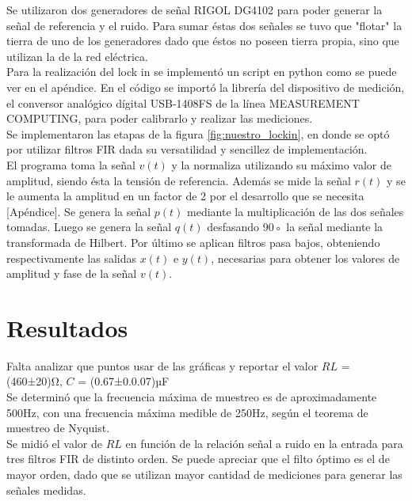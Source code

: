 \documentclass[11pt,a4paper]{extarticle}
\begin{document}
\begin{multicols}{2}
Se utilizaron dos generadores de señal RIGOL DG4102 
para poder generar la señal de referencia y el ruido.
Para sumar éstas dos señales se tuvo que "flotar" la 
tierra de uno de los generadores dado que éstos no poseen 
tierra propia, sino que utilizan la de la red eléctrica.\\

Para la realización del lock in se implementó un 
script en python como se puede ver en el apéndice.
En el código se importó la librería del dispositivo 
de medición, el 
conversor analógico dígital USB-1408FS de la línea 
MEASUREMENT COMPUTING, para poder 
calibrarlo y realizar las mediciones.\\

Se implementaron 
las etapas de la figura \ref{fig:nuestro_lockin},
 en donde se optó por utilizar filtros FIR dada 
 su versatilidad y sencillez de implementación.\\

El programa toma la señal $v(t)$
y la normaliza utilizando su máximo valor de amplitud,
 siendo ésta la tensión de referencia. Además se mide 
 la señal $r(t)$ y se le aumenta la amplitud en un factor
 de 2 por el desarrollo que se necesita [Apéndice].
Se genera la señal $p(t)$ mediante la multiplicación de 
las dos señales tomadas.
Luego se genera la señal $q(t)$ desfasando 90◦
la señal 
mediante la transformada de Hilbert.
Por último se aplican filtros pasa bajos,
 obteniendo respectivamente las salidas $x(t)$ e $y(t)$,
  necesarias para obtener los
valores de amplitud y fase de la señal $v(t)$.


\section{Resultados}

Falta analizar que puntos usar de las gráficas y reportar
el valor $RL$ = (460±20)Ω, $C$ = (0.67±0.0.07)µF\\

Se determinó que la frecuencia máxima de muestreo es 
de aproximadamente 
500Hz, con una frecuencia máxima medible de 250Hz, 
según el teorema de muestreo de Nyquist. \cite{haykin_4}\\

Se midió el valor de $RL$ en función 
de la relación señal a ruido en la entrada para tres 
filtros FIR de distinto orden.
Se puede apreciar que el filto óptimo es el de mayor 
orden, dado que se utilizan mayor cantidad de 
mediciones para generar las señales medidas.


\end{multicols}
\end{document}
